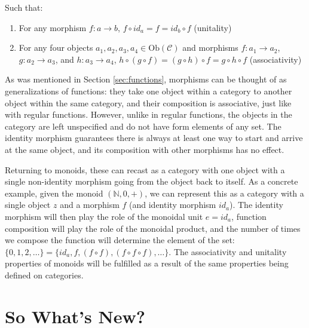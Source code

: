 \documentclass[12pt,a4paper]{article}
\begin{document}
Such that:

\begin{enumerate}
\renewcommand{\theenumi}{\alph{enumi}}
\item For any morphism $f: a \to b$, $f \circ id_a = f = id_b \circ f$ (unitality)
\item For any four objects $a_1, a_2, a_3, a_4 \in \text{Ob}(\mathcal{C})$ and morphisms $f: a_1 \to a_2$, $g: a_2 \to a_3$, and $h: a_3 \to a_4$, $h \circ (g \circ f) = (g \circ h) \circ f = g \circ h \circ f$ (associativity)
\end{enumerate}


As was mentioned in Section \ref{sec:functions}, morphisms can be thought of as generalizations of functions: they take one object within a category to another object within the same category, and their composition is associative, just like with regular functions. However, unlike in regular functions, the objects in the category are left unspecified and do not have form elements of any set. The identity morphism guarantees there is always at least one way to start and arrive at the same object, and its composition with other morphisms has no effect.

Returning to monoids, these can recast as a category with one object with a single non-identity morphism going from the object back to itself. As a concrete example, given the monoid $(\mathbb{N}, 0, +)$, we can represent this as a category with a single object $z$ and a morphism $f$ (and identity morphism $id_a$). The identity morphism will then play the role of the monoidal unit $e = id_a$, function composition will play the role of the monoidal product, and the number of times we compose the function will determine the element of the set: $\{0, 1, 2, \ldots \} = \{id_a, f, (f \circ f), (f \circ f \circ f), \ldots \}$. The associativity and unitality properties of monoids will be fulfilled as a result of the same properties being defined on categories.  


\section{So What's New?}
\label{sec:whatsnew}
\end{document}
